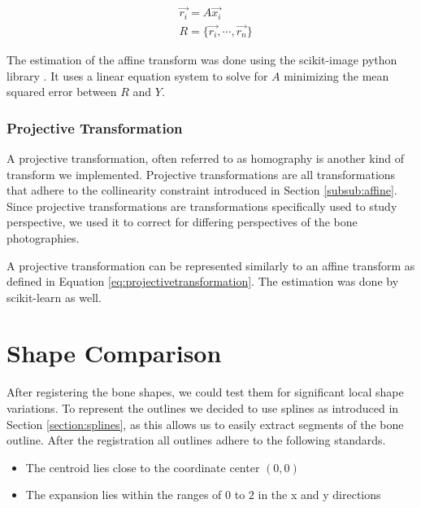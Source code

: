 \documentclass[pdftex,12pt,a4paper]{report}
\begin{document}
\begin{equation}
\label{eq:projectivetransformation}
\begin{split}
& \vec{r_i} = A \vec{x_i} \\
& R = \{ \vec{r_i}, \cdots, \vec{r_n} \}
\end{split}
\end{equation}

The estimation of the affine transform was done using the scikit-image python library \cite{van2014scikit}.
It uses a linear equation system to solve for $A$ minimizing the mean squared error between $R$ and $Y$.

\subsubsection{Projective Transformation}

A projective transformation, often referred to as homography is another kind of transform we implemented.
Projective transformations are all transformations that adhere to the collinearity constraint introduced
in Section \ref{subsub:affine}. Since projective transformations are transformations specifically used
to study perspective, we used it to correct for differing perspectives of the bone photographies.

A projective transformation can be represented similarly to an affine transform as defined in Equation
\ref{eq:projectivetransformation}. The estimation was done by scikit-learn \cite{van2014scikit} as well. 

\section{Shape Comparison}
\label{sec:shape-comparison}

After registering the bone shapes, we could test them for significant local shape variations.
To represent the outlines we decided to use splines as introduced in Section \ref{section:splines},
as this allows us to easily extract segments of the bone outline. After the registration all outlines
adhere to the following standards.

\begin{itemize}
\item The centroid lies close to the coordinate center $(0,0)$
\item The expansion lies within the ranges of $0$ to $2$ in the x and y directions
\end{itemize}
\end{document}
